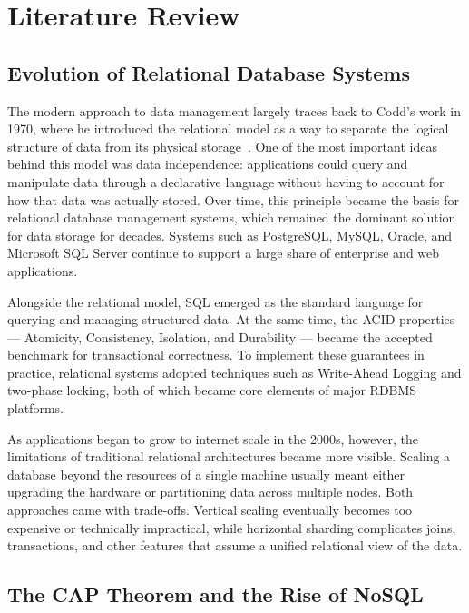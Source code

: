 %
%
\chapter{Literature Review}
\label{chap:lit-review}
\setlength{\parskip}{1em}

\section{Evolution of Relational Database Systems}

The modern approach to data management largely traces back to Codd’s work in 1970, where he introduced the relational model as a way to separate the logical structure of data from its physical storage~\cite{codd1970}. One of the most important ideas behind this model was data independence: applications could query and manipulate data through a declarative language without having to account for how that data was actually stored. Over time, this principle became the basis for relational database management systems, which remained the dominant solution for data storage for decades. Systems such as PostgreSQL, MySQL, Oracle, and Microsoft SQL Server continue to support a large share of enterprise and web applications.

Alongside the relational model, SQL emerged as the standard language for querying and managing structured data. At the same time, the ACID properties --- Atomicity, Consistency, Isolation, and Durability --- became the accepted benchmark for transactional correctness. To implement these guarantees in practice, relational systems adopted techniques such as Write-Ahead Logging and two-phase locking, both of which became core elements of major RDBMS platforms.

As applications began to grow to internet scale in the 2000s, however, the limitations of traditional relational architectures became more visible. Scaling a database beyond the resources of a single machine usually meant either upgrading the hardware or partitioning data across multiple nodes. Both approaches came with trade-offs. Vertical scaling eventually becomes too expensive or technically impractical, while horizontal sharding complicates joins, transactions, and other features that assume a unified relational view of the data.

\section{The CAP Theorem and the Rise of NoSQL}

